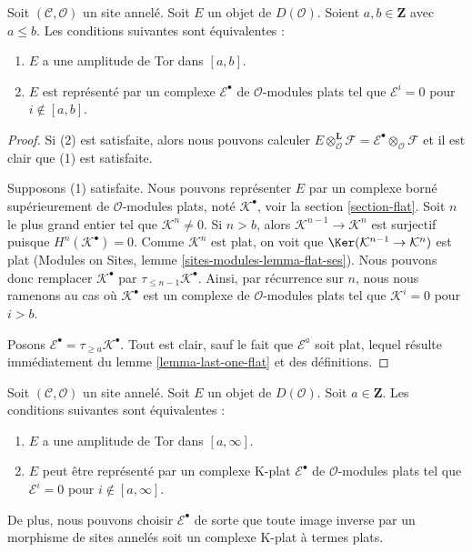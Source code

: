 \begin{lemma}
\label{lemma-tor-amplitude}
Soit $(\mathcal{C}, \mathcal{O})$ un site annelé. Soit $E$ un objet de
$D(\mathcal{O})$. Soient $a, b \in \mathbf{Z}$ avec $a \leq b$. Les
conditions suivantes sont équivalentes :
\begin{enumerate}
\item $E$ a une amplitude de Tor dans $[a, b]$.
\item $E$ est représenté par un complexe $\mathcal{E}^\bullet$ de
$\mathcal{O}$-modules plats tel que $\mathcal{E}^i = 0$ pour
$i \not \in [a, b]$.
\end{enumerate}
\end{lemma}

\begin{proof}
Si (2) est satisfaite, alors nous pouvons calculer
$E \otimes_\mathcal{O}^\mathbf{L} \mathcal{F} =
\mathcal{E}^\bullet \otimes_\mathcal{O} \mathcal{F}$
et il est clair que (1) est satisfaite.

\medskip\noindent
Supposons (1) satisfaite. Nous pouvons représenter $E$ par un complexe borné
supérieurement de $\mathcal{O}$-modules plats, noté $\mathcal{K}^\bullet$, voir
la section \ref{section-flat}. Soit $n$ le plus grand entier tel que
$\mathcal{K}^n \not = 0$. Si $n > b$, alors
$\mathcal{K}^{n - 1} \to \mathcal{K}^n$ est surjectif puisque
$H^n(\mathcal{K}^\bullet) = 0$. Comme $\mathcal{K}^n$ est plat, on voit que
$\Ker(\mathcal{K}^{n - 1} \to \mathcal{K}^n)$ est plat (Modules on Sites,
lemme \ref{sites-modules-lemma-flat-ses}). Nous pouvons donc remplacer
$\mathcal{K}^\bullet$ par $\tau_{\leq n - 1}\mathcal{K}^\bullet$. Ainsi, par
récurrence sur $n$, nous nous ramenons au cas où $\mathcal{K}^\bullet$ est un complexe
de $\mathcal{O}$-modules plats tel que $\mathcal{K}^i = 0$ pour $i > b$.

\medskip\noindent
Posons $\mathcal{E}^\bullet = \tau_{\geq a}\mathcal{K}^\bullet$.
Tout est clair, sauf le fait que $\mathcal{E}^a$ soit plat, lequel résulte
immédiatement du lemme \ref{lemma-last-one-flat} et des définitions.
\end{proof}

\begin{lemma}
\label{lemma-bounded-below-tor-amplitude}
Soit $(\mathcal{C}, \mathcal{O})$ un site annelé. Soit $E$ un objet de
$D(\mathcal{O})$. Soit $a \in \mathbf{Z}$. Les conditions suivantes sont
équivalentes :
\begin{enumerate}
\item $E$ a une amplitude de Tor dans $[a, \infty]$.
\item $E$ peut être représenté par un complexe K-plat
$\mathcal{E}^\bullet$ de $\mathcal{O}$-modules plats tel que
$\mathcal{E}^i = 0$ pour $i \not \in [a, \infty]$.
\end{enumerate}
De plus, nous pouvons choisir $\mathcal{E}^\bullet$ de sorte que toute image
inverse par un morphisme de sites annelés soit un complexe K-plat à termes
plats.
\end{lemma}

